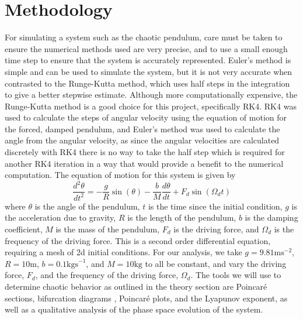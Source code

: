\documentclass[11pt]{article} %
\begin{document}
\section{Methodology}
    For simulating a system such as the chaotic pendulum, care must be taken to ensure the numerical methods 
    used are very precise, and to use a small enough time step to ensure that the system is accurately represented.
    Euler's method is simple and can be used to simulate the system, but it is not very accurate when contrasted to
    the Runge-Kutta method, which uses half steps in the integration to give a better stepwise estimate. Although 
    more computationally expensive, the Runge-Kutta method is a good choice for this project, specifically
    RK4\cite{Strogatz2000}. RK4 was used to calculate the steps of angular velocity using the equation of
    motion for the forced, damped pendulum, and Euler's method was used to calculate the angle from the angular velocity, 
    as since the angular velocities are calculated discretely with RK4 there is no way to take the half step which is required 
    for another RK4 iteration in a way that would provide a benefit to the numerical computation. The equation of motion
    for this system\cite{PhysRevE.53.1579} is given by
    \begin{equation}
        \frac{d^2\theta}{dt^2} = -\frac{g}{R}\sin(\theta) - \frac{b}{M}\frac{d\theta}{dt} + F_d\sin(\Omega_d t)
    \end{equation}
    where $\theta$ is the angle of the pendulum, $t$ is the time since the initial condition, $g$ is the acceleration due to gravity,
    $R$ is the length of the pendulum, $b$ is the damping coefficient, $M$ is the mass of the pendulum, $F_d$ is the driving force,
    and $\Omega_d$ is the frequency of the driving force. This is a second order differential equation, requiring a mesh of 2d initial
    conditions. For our analysis, we take $g=9.81\text{ms}^{-2}$, $R=10\text{m}$, $b=0.1\text{kgs}^{-1}$, and $M=10\text{kg}$ to all 
    be constant, and vary the driving force, $F_d$, and the frequency of the driving force, $\Omega_d$. The tools we will use to determine
    chaotic behavior as outlined in the theory section are Poincar\'e sections\cite{PoincareSection}, bifurcation diagrams \cite{Bifurcation}, 
    Poincar\'e plots\cite{kamen1996poincare}, and the Lyapunov exponent\cite{Lyapunov}, as well as a qualitative analysis of the phase space
     evolution of the system.\\
\end{document}
